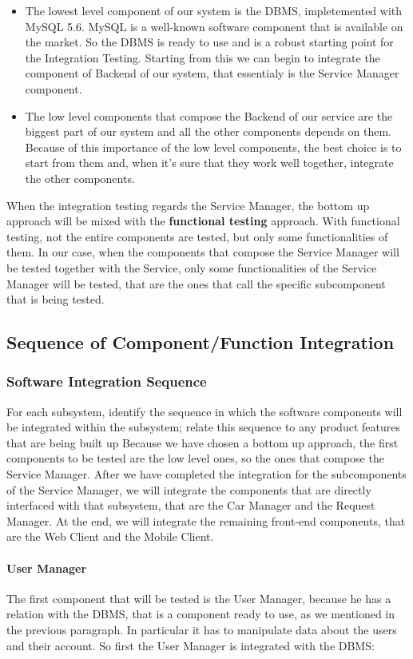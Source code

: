 \begin{itemize}
\item The lowest level component of our system is the DBMS, impletemented with MySQL 5.6. MySQL is a well-known software component that is available on the market. So the DBMS is ready to use and is a robust starting point for the Integration Testing. Starting from this we can begin to integrate the component of Backend of our system, that essentialy is the Service Manager component. 
\item The low level components that compose the Backend of our service are the biggest part of our system and all the other components depends on them. Because of this importance of the low level components, the best choice is to start from them and, when it's sure that they work well together, integrate the other components.
\end{itemize}  

When the integration testing regards the Service Manager, the bottom up approach will be mixed with the \textbf{functional testing} approach. With functional testing, not the entire components are tested, but only some functionalities of them. In our case, when the components that compose the Service Manager will be tested together with the Service, only some functionalities of the Service Manager will be tested, that are the ones that call the specific subcomponent that is being tested.
\subsection{Sequence of Component/Function Integration} 
\subsubsection{Software Integration Sequence} For each subsystem, identify the sequence in which the software components will be integrated within the subsystem; relate this sequence to any product features that are being built up
\newline
Because we have chosen a bottom up approach, the first components to be tested are the low level ones, so the ones that compose the Service Manager. After we have completed the integration for the subcomponents of the Service Manager, we will integrate the components that are directly interfaced with that subsystem, that are the Car Manager and the Request Manager. At the end, we will integrate the remaining front-end components, that are the Web Client and the Mobile Client.
\paragraph{User Manager}
The first component that will be tested is the User Manager, because he has a relation with the DBMS, that is a component ready to use, as we mentioned in the previous paragraph. In particular it has to manipulate data about the users and their account.
So first the User Manager is integrated with the DBMS:

